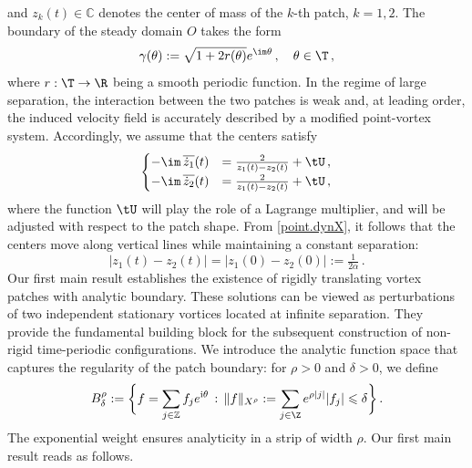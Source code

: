\documentclass[a4paper,reqno,10pt]{article}
\newcommand{\ii }{{\rm i} }
\begin{document}
and $z_k(t) \in \mathbb{C}$ denotes the center of mass of the $k$-th patch, $k=1,2$. The boundary of the steady domain $O$ takes the form
\begin{equation}\label{param.gamma01}
	\gamma(\theta) := \sqrt{1 + 2r(\theta)} e^{\im \theta} \,,  \quad \theta\in\T\,,
\end{equation}
where $r:\T\to\R$ being a smooth  periodic function. In the regime of large separation, the interaction between the two patches is weak and, at leading order, the induced velocity field is accurately described by a modified point-vortex system. 
Accordingly, we assume that the centers satisfy
\begin{align}\label{point.dynX}
\begin{cases}
  -\im \,\overline{\dot{z}_1} (t) & = \frac{2}{z_1(t) - z_2(t)} + \tU  \,, \\
 		-\im\,   \overline{\dot{z}_2} (t) & =   \frac{2}{z_1(t) - z_2(t)} + \tU \,,
\end{cases}
\end{align}
where the function $\tU$ will play the role of a Lagrange multiplier, and will be adjusted with respect to the patch shape. 
From \eqref{point.dynX}, it follows that the centers move along vertical lines while maintaining a constant separation:
\begin{equation}\label{def.alpha.intro}
   |z_1(t) - z_2(t)| = |z_1(0) - z_2(0)|:=\tfrac{1}{2\alpha}  \,.
\end{equation}
Our first main result establishes the existence of rigidly translating vortex patches with analytic boundary.
These solutions can be viewed as perturbations of two independent stationary vortices located at infinite separation.
They provide the fundamental building block for the subsequent construction of non-rigid time-periodic configurations. 
We introduce the analytic function space that captures the regularity of the patch boundary: for $\rho>0$ and $\delta>0$, we define
\begin{equation}
		  B_\delta^{\rho}:=\bigg\{ f=\sum_{j\in\mathbb{Z}} f_j e^{\ii \theta}\, :\,  \| f\|_{X^{\rho}}  := \sum_{j\in \Z} e^{\rho|j|}  |f_{j}| \leqslant \delta  \bigg\}\,.   
\end{equation}
The exponential weight ensures analyticity in a strip of width $\rho$.
Our first main result reads as follows.
\end{document}
